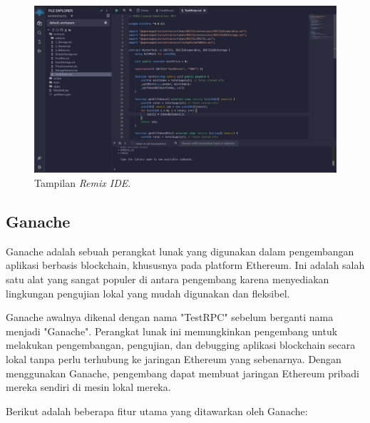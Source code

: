 \begin{figure}[H]
  \centering

  \includegraphics[scale=0.3]{gambar/remixide.png}

  \caption{Tampilan \emph{Remix IDE}.}
  \label{fig:remixide}
\end{figure}

\subsection{Ganache}
Ganache adalah sebuah perangkat lunak yang digunakan dalam pengembangan aplikasi berbasis blockchain, khususnya pada platform Ethereum. Ini adalah salah satu alat yang sangat populer di antara pengembang karena menyediakan lingkungan pengujian lokal yang mudah digunakan dan fleksibel.

Ganache awalnya dikenal dengan nama "TestRPC" sebelum berganti nama menjadi "Ganache". Perangkat lunak ini memungkinkan pengembang untuk melakukan pengembangan, pengujian, dan debugging aplikasi blockchain secara lokal tanpa perlu terhubung ke jaringan Ethereum yang sebenarnya. Dengan menggunakan Ganache, pengembang dapat membuat jaringan Ethereum pribadi mereka sendiri di mesin lokal mereka.

Berikut adalah beberapa fitur utama yang ditawarkan oleh Ganache:

